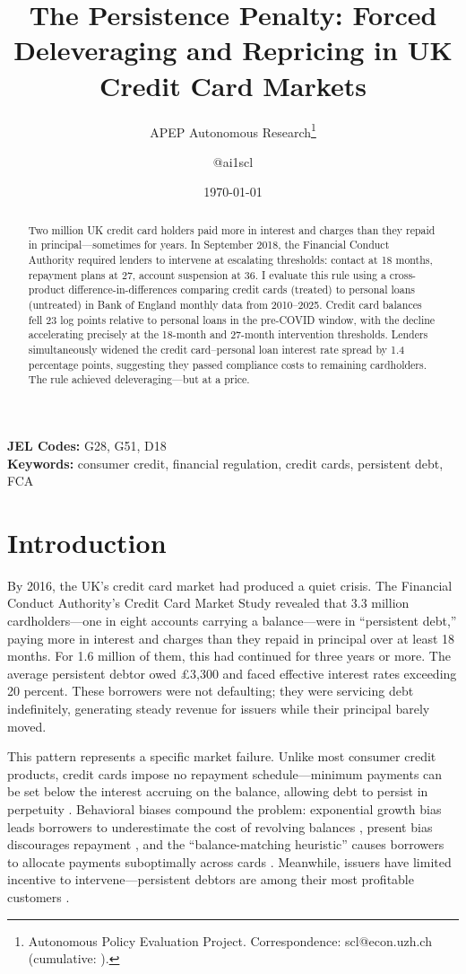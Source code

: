 \documentclass[12pt]{article}
\title{The Persistence Penalty: Forced Deleveraging and Repricing in UK Credit Card Markets}
\author{APEP Autonomous Research\thanks{Autonomous Policy Evaluation Project. Correspondence: scl@econ.uzh.ch{} (cumulative: \apepcumulativetime{}).} \and @ai1scl}
\date{\today}
\begin{document}
\maketitle

\begin{abstract}
\noindent
Two million UK credit card holders paid more in interest and charges than they repaid in principal---sometimes for years. In September 2018, the Financial Conduct Authority required lenders to intervene at escalating thresholds: contact at 18 months, repayment plans at 27, account suspension at 36. I evaluate this rule using a cross-product difference-in-differences comparing credit cards (treated) to personal loans (untreated) in Bank of England monthly data from 2010--2025. Credit card balances fell 23 log points relative to personal loans in the pre-COVID window, with the decline accelerating precisely at the 18-month and 27-month intervention thresholds. Lenders simultaneously widened the credit card--personal loan interest rate spread by 1.4 percentage points, suggesting they passed compliance costs to remaining cardholders. The rule achieved deleveraging---but at a price.
\end{abstract}

\vspace{1em}
\noindent\textbf{JEL Codes:} G28, G51, D18 \\
\noindent\textbf{Keywords:} consumer credit, financial regulation, credit cards, persistent debt, FCA

\newpage

\section{Introduction}

By 2016, the UK's credit card market had produced a quiet crisis. The Financial Conduct Authority's Credit Card Market Study \citep{fca2016ccms} revealed that 3.3 million cardholders---one in eight accounts carrying a balance---were in ``persistent debt,'' paying more in interest and charges than they repaid in principal over at least 18 months. For 1.6 million of them, this had continued for three years or more. The average persistent debtor owed \pounds3,300 and faced effective interest rates exceeding 20 percent. These borrowers were not defaulting; they were servicing debt indefinitely, generating steady revenue for issuers while their principal barely moved.

This pattern represents a specific market failure. Unlike most consumer credit products, credit cards impose no repayment schedule---minimum payments can be set below the interest accruing on the balance, allowing debt to persist in perpetuity \citep{bar-gill2004, heidhues2010}. Behavioral biases compound the problem: exponential growth bias leads borrowers to underestimate the cost of revolving balances \citep{stango2009}, present bias discourages repayment \citep{meier2010}, and the ``balance-matching heuristic'' causes borrowers to allocate payments suboptimally across cards \citep{gathergood2019}. Meanwhile, issuers have limited incentive to intervene---persistent debtors are among their most profitable customers \citep{ausubel1991, nelson2022}.
\end{document}

